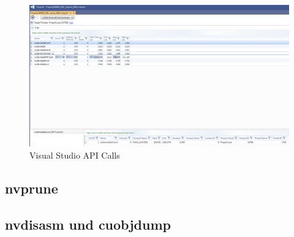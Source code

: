                     \begin{figure}[h]
			            \centering
			            \includegraphics[width=\textwidth]{chapter3/pictures/VSapi.png}
			            \caption{Visual Studio API Calls}
			            \label{fig3:vsapi}
			        \end{figure}
			        \FloatBarrier
			\subsection{nvprune}
			\subsection{nvdisasm und cuobjdump}
		
